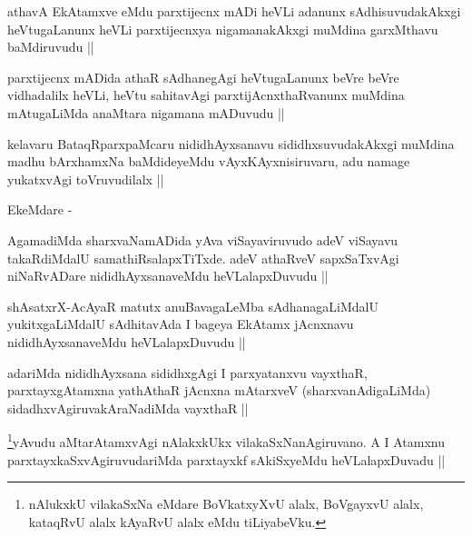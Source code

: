 
\begin{artha}
athavA EkAtamxve eMdu parxtijecnx mADi heVLi adanunx sAdhisuvudakAkxgi
heVtugaLanunx heVLi parxtijecnxya nigamanakAkxgi muMdina garxMthavu
baMdiruvudu ||
\end{artha}


\begin{artha}
parxtijecnx mADida athaR sAdhanegAgi heVtugaLanunx beVre beVre
vidhadalilx heVLi, heVtu sahitavAgi parxtijAcnxthaRvanunx muMdina
mAtugaLiMda anaMtara nigamana mADuvudu ||
\end{artha}

\begin{artha}
kelavaru BataqRparxpaMcaru nididhAyxsanavu sididhxsuvudakAkxgi muMdina
madhu bArxhamxNa baMdideyeMdu vAyxKAyxnisiruvaru, adu namage
yukatxvAgi toVruvudilalx ||

EkeMdare -
\end{artha}

\begin{artha}
AgamadiMda sharxvaNamADida yAva viSayaviruvudo adeV viSayavu
takaRdiMdalU samathiRsalapxTiTxde. adeV athaRveV sapxSaTxvAgi
niNaRvADare nididhAyxsanaveMdu heVLalapxDuvudu ||
\end{artha}


\begin{artha}
shAsatxrX-AcAyaR matutx anuBavagaLeMba sAdhanagaLiMdalU
yukitxgaLiMdalU sAdhitavAda I bageya EkAtamx jAcnxnavu
nididhAyxsanaveMdu heVLalapxDuvudu ||
\end{artha}

\begin{artha}
adariMda nididhAyxsana sididhxgAgi I parxyatanxvu vayxthaR,
parxtayxgAtamxna yathAthaR jAcnxna mAtarxveV (sharxvanAdigaLiMda)
sidadhxvAgiruvakAraNadiMda vayxthaR ||
\end{artha}

\begin{artha}
\footnote[1]{nAlukxkU vilakaSxNa eMdare BoVkatxyXvU alalx, BoVgayxvU
  alalx, kataqRvU alalx kAyaRvU alalx eMdu tiLiyabeVku.}yAvudu aMtarAtamxvAgi nAlakxkUkx vilakaSxNanAgiruvano. A
I Atamxnu parxtayxkaSxvAgiruvudariMda parxtayxkf sAkiSxyeMdu
heVLalapxDuvadu ||
\end{artha}


